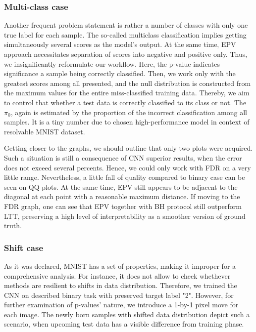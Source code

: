 \documentclass{article}
\begin{document}
\subsubsection{Multi-class case}

Another frequent problem statement is rather a number of classes with only one true label for each sample. The so-called multiclass classification implies getting simultaneously several scores as the model's output. At the same time, EPV approach necessitates separation of scores into negative and positive only. Thus, we insignificantly reformulate our workflow. Here, the p-value indicates significance a sample being correctly classified. Then, we work only with the greatest scores among all presented, and the null distribution is constructed from the maximum values for the entire miss-classified training data. Thereby, we aim to control that whether a test data is correctly classified to its class or not. The $\pi_0$, again is estimated by the proportion of the incorrect classification among all samples. It is a tiny number due to chosen high-performance model in context of resolvable MNIST dataset.

Getting closer to the graphs, we should outline that only two plots were acquired. Such a situation is still a consequence of CNN superior results, when the error does not exceed several percents. Hence, we could only work with FDR on a very little range. Nevertheless, a little fall of quality compared to binary case can be seen on QQ plots. At the same time, EPV still appears to be adjacent to the diagonal at each point with a reasonable maximum distance. If moving to the FDR graph, one can see that EPV together with BH protocol still outperform LTT, preserving a high level of interpretability as a smoother version of ground truth. 

\subsubsection{Shift case}

As it was declared, MNIST has a set of properties, making it improper for a comprehensive analysis. For instance, it does not allow to check whethever methods are resilient to shifts in data distribution. Therefore, we trained the CNN on described binary task with preserved target label "2". However, for further examination of p-values’ nature, we introduce a 1-by-1 pixel move for each image. The newly born samples with shifted data distribution depict such a scenario, when upcoming test data has a visible difference from training phase. 
\end{document}
